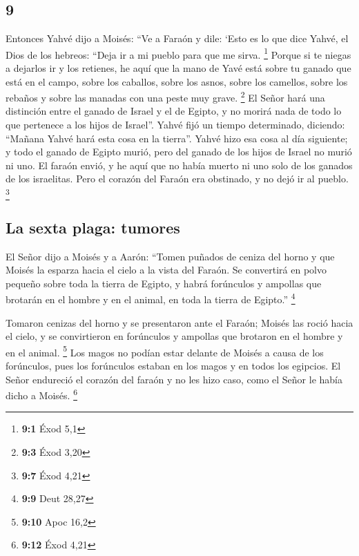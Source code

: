 \begin{paracol}{2}
\hypertarget{section-16}{%
\section{9}\label{section-16}}

 Entonces Yahvé dijo a Moisés: ``Ve a Faraón y dile: `Esto
es lo que dice Yahvé, el Dios de los hebreos: ``Deja ir a mi pueblo para
que me sirva. \footnote{\textbf{9:1} Éxod 5,1}  Porque si
te niegas a dejarlos ir y los retienes,  he aquí que la
mano de Yavé está sobre tu ganado que está en el campo, sobre los
caballos, sobre los asnos, sobre los camellos, sobre los rebaños y sobre
las manadas con una peste muy grave. \footnote{\textbf{9:3} Éxod 3,20}
 El Señor hará una distinción entre el ganado de Israel y
el de Egipto, y no morirá nada de todo lo que pertenece a los hijos de
Israel''.  Yahvé fijó un tiempo determinado, diciendo:
``Mañana Yahvé hará esta cosa en la tierra''.  Yahvé hizo
esa cosa al día siguiente; y todo el ganado de Egipto murió, pero del
ganado de los hijos de Israel no murió ni uno.  El faraón
envió, y he aquí que no había muerto ni uno solo de los ganados de los
israelitas. Pero el corazón del Faraón era obstinado, y no dejó ir al
pueblo. \footnote{\textbf{9:7} Éxod 4,21}

\hypertarget{la-sexta-plaga-tumores}{%
\subsection{La sexta plaga: tumores}\label{la-sexta-plaga-tumores}}

 El Señor dijo a Moisés y a Aarón: ``Tomen puñados de
ceniza del horno y que Moisés la esparza hacia el cielo a la vista del
Faraón.  Se convertirá en polvo pequeño sobre toda la
tierra de Egipto, y habrá forúnculos y ampollas que brotarán en el
hombre y en el animal, en toda la tierra de Egipto.'' \footnote{\textbf{9:9}
  Deut 28,27}

 Tomaron cenizas del horno y se presentaron ante el
Faraón; Moisés las roció hacia el cielo, y se convirtieron en forúnculos
y ampollas que brotaron en el hombre y en el animal. \footnote{\textbf{9:10}
  Apoc 16,2}  Los magos no podían estar delante de Moisés
a causa de los forúnculos, pues los forúnculos estaban en los magos y en
todos los egipcios.  El Señor endureció el corazón del
faraón y no les hizo caso, como el Señor le había dicho a Moisés.
\footnote{\textbf{9:12} Éxod 4,21}


\end{paracol}
